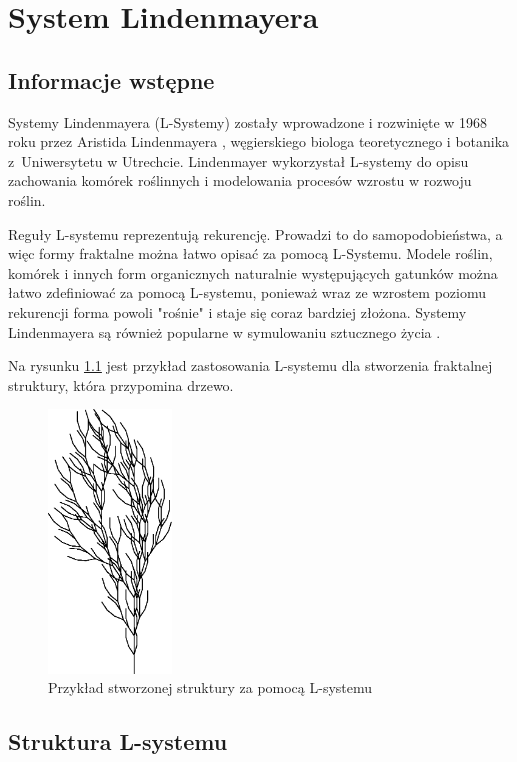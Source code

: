 \documentclass[a4paper,twoside,12pt]{report}
\begin{document}


\chapter{System Lindenmayera} 


\section{Informacje wstępne}

Systemy Lindenmayera (L-Systemy) zostały wprowadzone i rozwinięte w 1968 roku
 przez Aristida Lindenmayera \cite{modelingOfPlants},
węgierskiego biologa teoretycznego i botanika z~Uniwersytetu w Utrechcie.
Lindenmayer wykorzystał L-systemy do opisu zachowania komórek roślinnych i
modelowania procesów wzrostu w rozwoju roślin.

Reguły L-systemu reprezentują rekurencję.
Prowadzi to do samopodobieństwa, a więc formy fraktalne można łatwo opisać za pomocą L-Systemu.
Modele roślin, komórek i innych form organicznych naturalnie występujących gatunków można łatwo zdefiniować za pomocą L-systemu,
ponieważ wraz ze wzrostem poziomu rekurencji forma powoli "rośnie" i staje się coraz bardziej złożona.
Systemy Lindenmayera są również popularne w symulowaniu sztucznego życia \cite{neuralStructures}.

Na rysunku \ref{fig:lsystreeexample} jest przykład zastosowania L-systemu dla stworzenia 
fraktalnej struktury, która przypomina drzewo.


\begin{figure}[H]
	\centering\includegraphics[height=7cm]{grafika/treefirst}
	\caption{Przykład stworzonej struktury za pomocą L-systemu}
    \label{fig:lsystreeexample}
\end{figure}

\section{Struktura L-systemu}
\end{document}
